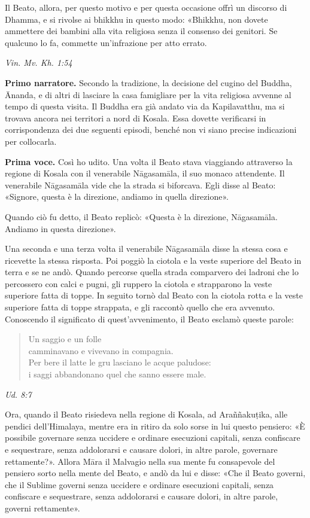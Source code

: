 Il Beato, allora, per questo motivo e per questa occasione offrì un
discorso di Dhamma, e si rivolse ai bhikkhu in questo modo: «Bhikkhu,
non dovete ammettere dei bambini alla vita religiosa senza il consenso
dei genitori. Se qualcuno lo fa, commette un’infrazione per atto errato.


\emph{Vin. Mv. Kh. 1:54}


\textbf{Primo narratore.} Secondo la tradizione, la decisione del cugino del
Buddha, Ānanda, e di altri di lasciare la casa famigliare per la vita
religiosa avvenne al tempo di questa visita. Il Buddha era già andato
via da Kapilavatthu, ma si trovava ancora nei territori a nord di
Kosala. Essa dovette verificarsi in corrispondenza dei due seguenti
episodi, benché non vi siano precise indicazioni per collocarla.


\textbf{Prima voce.} Così ho udito. Una volta il Beato stava viaggiando
attraverso la regione di Kosala con il venerabile Nāgasamāla, il suo
monaco attendente. Il venerabile Nāgasamāla vide che la strada si
biforcava. Egli disse al Beato: «Signore, questa è la direzione, andiamo
in quella direzione».


Quando ciò fu detto, il Beato replicò: «Questa è la direzione,
Nāgasamāla. Andiamo in questa direzione».


Una seconda e una terza volta il venerabile Nāgasamāla disse la stessa
cosa e ricevette la stessa risposta. Poi poggiò la ciotola e la veste
superiore del Beato in terra e se ne andò. Quando percorse quella strada
comparvero dei ladroni che lo percossero con calci e pugni, gli ruppero
la ciotola e strapparono la veste superiore fatta di toppe. In seguito
tornò dal Beato con la ciotola rotta e la veste superiore fatta di toppe
strappata, e gli raccontò quello che era avvenuto. Conoscendo il
significato di quest’avvenimento, il Beato esclamò queste parole:


\begin{quotation}
Un saggio e un folle \\
camminavano e vivevano in compagnia. \\
Per bere il latte le gru lasciano le acque paludose: \\
i saggi abbandonano quel che sanno essere male.
\end{quotation}

\emph{Ud. 8:7}


Ora, quando il Beato risiedeva nella regione di Kosala, ad Araññakuṭika,
alle pendici dell’Himalaya, mentre era in ritiro da solo sorse in lui
questo pensiero: «È possibile governare senza uccidere e ordinare
esecuzioni capitali, senza confiscare e sequestrare, senza addolorarsi e
causare dolori, in altre parole, governare rettamente?». Allora Māra il
Malvagio nella sua mente fu consapevole del pensiero sorto nella mente
del Beato, e andò da lui e disse: «Che il Beato governi, che il Sublime
governi senza uccidere e ordinare esecuzioni capitali, senza confiscare
e sequestrare, senza addolorarsi e causare dolori, in altre parole,
governi rettamente».



